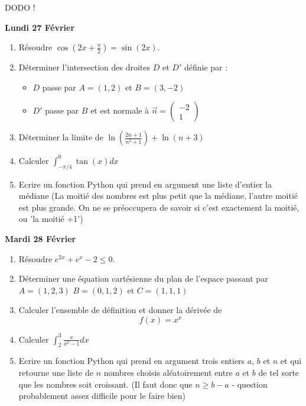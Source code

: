 \documentclass[a4paper, 11pt,reqno]{article}
\renewcommand{\ddp}{\displaystyle}
\newcommand\vv[1]{\overrightarrow{#1}}
\begin{document}
\vspace{0.3cm}
\begin{center}
DODO ! 
\end{center}
\vspace{0.3cm}
\begin{center}
\textbf{Lundi 27 Février }
\end{center}
\begin{enumerate}
\item Résoudre $\cos(2x+\frac{\pi}{2}) =\sin(2x)$.
\item Déterminer  l'intersection des droites  $D$ et $D'$ définie par :
\begin{itemize}
\item $D$ passe par $A=(1,2) $ et $B=(3,-2)$
\item $D'$ passe par $B$ et est normale à $\vv{n}= \begin{pmatrix}
-2\\
1
\end{pmatrix}$ 
\end{itemize}
\item Déterminer la limite de $\ln(\frac{2n+1}{n^2+1})+\ln(n+3)$
\item Calculer $\ddp \int_{-\pi/4}^0 \tan(x)
dx$

\item Ecrire un fonction Python qui prend en argument une liste d'entier la médiane (La moitié des nombres est plus petit que la médiane, l'autre moitié est plus grande. On ne se préoccupera  de savoir si c'est exactement la moitié, ou 'la moitié +1') 
\end{enumerate}



\begin{center}
\textbf{Mardi 28 Février }
\end{center}

\begin{enumerate}
\item Résoudre $e^{2x} +e^x-2\leq 0$.
\item Déterminer une équation cartésienne du plan de l'espace passant par $A=(1,2,3)$ $B=(0,1,2)$ et $C=(1,1,1)$
\item Calculer l'ensemble de définition et donner la dérivée de $$f(x) =x^x$$
\item Calculer $\ddp \int_{2}^3 \frac{x}{x^2-1}dx$
\item Ecrire un fonction Python qui prend en argument  trois entiers $a$, $b$ et $n$  et qui retourne une liste de $n$ nombres choisis aléatoirement entre $a$ et $b$ de tel sorte que les nombres soit croissant. (Il faut donc  que $n\geq b-a$ - question probablement assez difficile pour le faire bien) 
\end{enumerate}
\end{document}
